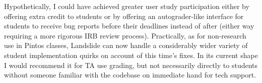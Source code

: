 Hypothetically, I could have achieved greater user study participation
either by offering extra credit to students
or by offering an autograder-like interface for students to receive bug reports before their deadlines instead of after
(either way requiring a more rigorous IRB review process).
Practically, as for non-research use in Pintos classes,
Landslide can now handle a considerably wider variety of student implementation quirks
on account of this time's fixes.
In its current shape I would recommend it for TA use grading,
but not necessarily directly to students without someone familiar with the codebase on immediate hand for tech support.


